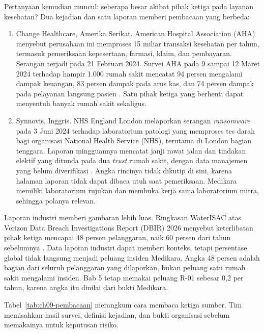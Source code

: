 Pertanyaan kemudian muncul: seberapa besar akibat pihak ketiga pada layanan kesehatan? Dua
kejadian dan satu laporan memberi pembacaan yang berbeda:
\begin{enumerate}
  \item Change Healthcare, Amerika Serikat. American Hospital Association (AHA) menyebut perusahaan
  ini memproses 15 miliar transaksi kesehatan per tahun, termasuk pemeriksaan kepesertaan,
  farmasi, klaim, dan pembayaran. Serangan terjadi pada 21 Februari 2024. Survei AHA pada 9 sampai
  12 Maret 2024 terhadap hampir 1.000 rumah sakit mencatat 94 persen mengalami dampak keuangan, 83
  persen dampak pada arus kas, dan 74 persen dampak pada pelayanan langsung pasien
  \cite{c09-aha-change}. Satu pihak ketiga yang berhenti dapat menyentuh banyak rumah sakit
  sekaligus.
  \item Synnovis, Inggris. NHS England London melaporkan serangan \textit{ransomware} pada 3 Juni
  2024 terhadap laboratorium patologi yang memproses tes darah bagi organisasi National Health
  Service (NHS), terutama di London bagian tenggara. Laporan mingguannya mencatat janji rawat jalan
  dan tindakan elektif yang ditunda pada dua \textit{trust} rumah sakit, dengan data manajemen yang
  belum diverifikasi \cite{c09-nhs-synnovis}. Angka rincinya tidak dikutip di sini, karena halaman
  laporan tidak dapat dibaca utuh saat pemeriksaan. Medikara memiliki laboratorium rujukan dan
  membuka kerja sama laboratorium mitra, sehingga polanya relevan.
\end{enumerate}

Laporan industri memberi gambaran lebih luas. Ringkasan WaterISAC atas Verizon Data Breach
Investigations Report (DBIR) 2026 menyebut keterlibatan pihak ketiga mencapai 48 persen
pelanggaran, naik 60 persen dari tahun sebelumnya \cite{c01-verizon-dbir2026,c09-waterisac-dbir}.
Data laporan industri dapat memberi konteks, tetapi persentase global tidak langsung menjadi
peluang insiden Medikara. Angka 48 persen adalah bagian dari seluruh pelanggaran yang dilaporkan,
bukan peluang satu rumah sakit mengalami insiden. Bab 5 tetap memakai peluang R-01 sebesar 0,2
per tahun, karena angka itu dinilai dari bukti Medikara.

Tabel~\ref{tab:ch09-pembacaan} merangkum cara membaca ketiga sumber. Tim memisahkan hasil survei,
definisi kejadian, dan bukti organisasi sebelum memakainya untuk keputusan risiko.

